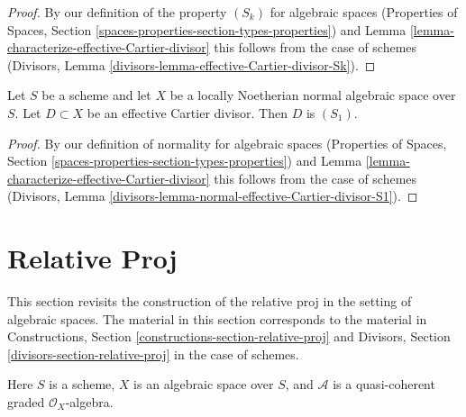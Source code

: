 \begin{proof}
By our definition of the property $(S_k)$ for algebraic spaces
(Properties of Spaces, Section
\ref{spaces-properties-section-types-properties})
and
Lemma \ref{lemma-characterize-effective-Cartier-divisor}
this follows from the case of schemes
(Divisors, Lemma \ref{divisors-lemma-effective-Cartier-divisor-Sk}).
\end{proof}

\begin{lemma}
\label{lemma-normal-effective-Cartier-divisor-S1}
Let $S$ be a scheme and let $X$ be a locally Noetherian normal
algebraic space over $S$. Let $D \subset X$ be an
effective Cartier divisor. Then $D$ is $(S_1)$.
\end{lemma}

\begin{proof}
By our definition of normality for algebraic spaces
(Properties of Spaces, Section
\ref{spaces-properties-section-types-properties})
and
Lemma \ref{lemma-characterize-effective-Cartier-divisor}
this follows from the case of schemes
(Divisors, Lemma \ref{divisors-lemma-normal-effective-Cartier-divisor-S1}).
\end{proof}










\section{Relative Proj}
\label{section-relative-proj}

\noindent
This section revisits the construction of the relative proj
in the setting of algebraic spaces. The material in this section
corresponds to the material in Constructions, Section
\ref{constructions-section-relative-proj}
and Divisors, Section \ref{divisors-section-relative-proj}
in the case of schemes.

\begin{situation}
\label{situation-relative-proj}
Here $S$ is a scheme, $X$ is an algebraic space over $S$, and
$\mathcal{A}$ is a quasi-coherent graded $\mathcal{O}_X$-algebra.
\end{situation}

